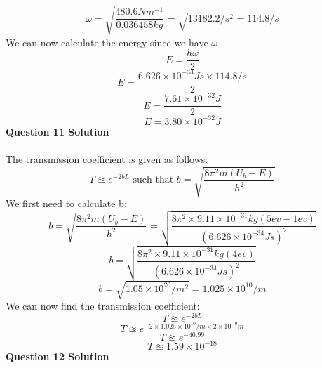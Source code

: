 \documentclass[9pt,addpoints]{exam}
\begin{document}
	$$\omega=\sqrt{\dfrac{480.6Nm^{-1}}{0.036458kg}}=\sqrt{13182.2/s^2}=114.8/s$$
	We can now calculate the energy since we have $\omega$
	$$E=\dfrac{h\omega}{2}$$
	$$E=\dfrac{6.626\times10^{-34}Js\times114.8/s}{2}$$
	$$E=\dfrac{7.61\times10^{-32}J}{2}$$
	$$E=3.80\times10^{-32}J$$
	\textbf{Question 11 Solution}\\ \\
	The transmission coefficient is given as follows:
	$$T\approxeq e^{-2bL}\text{ such that }b=\sqrt{\dfrac{8\pi^2m(U_b-E)}{h^2}}$$
	We first need to calculate b:
	$$b=\sqrt{\dfrac{8\pi^2m(U_b-E)}{h^2}}=\sqrt{\dfrac{8\pi^2\times9.11\times10^{-31}kg(5ev-1ev)}{(6.626\times10^{-34}Js)^2}}$$
	$$b=\sqrt{\dfrac{8\pi^2\times9.11\times10^{-31}kg(4ev)}{(6.626\times10^{-34}Js)^2}}$$
	$$b=\sqrt{1.05\times10^{20}/m^2}= 1.025\times10^{10}/m$$
	We can now find the transmission coefficient:
	$$T\approxeq e^{-2bL}$$
	$$T\approxeq e^{-2\times1.025\times10^{10}/m\times2\times10^{-9}m}$$
	$$T\approxeq e^{-40.99}$$
	$$T\approxeq 1.59\times10^{-18}$$
	\textbf{Question 12 Solution}\\ \\	
	
\end{document}
